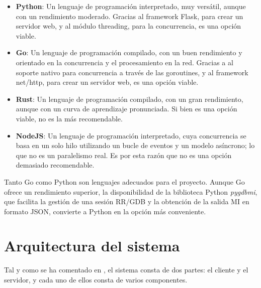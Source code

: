 \begin{itemize}
    \item \textbf{Python}: Un lenguaje de programación interpretado, muy versátil, aunque con un rendimiento moderado. Gracias al framework Flask, para crear un servidor web, y al módulo threading, para la concurrencia, es una opción viable. 
    \item \textbf{Go}: Un lenguaje de programación compilado, con un buen rendimiento y orientado en la concurrencia y el procesamiento en la red. Gracias a al soporte nativo para concurrencia a través de las goroutines, y al framework net/http, para crear un servidor web, es una opción viable.
    \item \textbf{Rust}: Un lenguaje de programación compilado, con un gran rendimiento, aunque con un curva de aprendizaje pronunciada. Si bien es una opción viable, no es la más recomendable. 
    \item \textbf{NodeJS}: Un lenguaje de programación interpretado, cuya concurrencia se basa en un solo hilo utilizando un bucle de eventos y un modelo asíncrono; lo que no es un paralelismo real. Es por esta razón que no es una opción demasiado recomendable. 
\end{itemize}

Tanto Go como Python son lenguajes adecuados para el proyecto. Aunque Go ofrece un rendimiento superior, la disponibilidad de la biblioteca Python \textit{pygdbmi}, que facilita la gestión de una sesión RR/GDB y la obtención de la salida MI en formato JSON, convierte a Python en la opción más conveniente.

\section{Arquitectura del sistema}\label{sec:arquitectura-sistema}

Tal y como se ha comentado en , el sistema consta de dos partes: el cliente y el servidor, y cada uno de ellos consta de varios componentes. 

